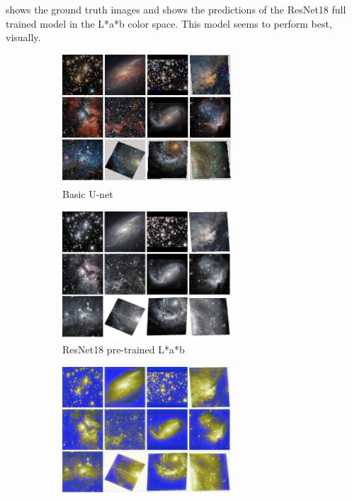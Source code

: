 \documentclass[10pt,twocolumn,letterpaper]{article}
\begin{document}
     shows the ground truth images and  shows the predictions of the ResNet18 full trained model in the L*a*b color space. This model seems to perform best, visually. 
    \begin{figure}[!htb]
    	\centering
    	\begin{subfigure}[t]{0.3\textwidth}
    		\centering
    		\includegraphics[width=0.7\textwidth]{figures/samples_pix2pix}
    		\caption{Basic U-net}
    		\label{fig: u-net_samples}
    	\end{subfigure}
    	\begin{subfigure}[t]{0.3\textwidth}
    		\centering
    		\includegraphics[width=0.7\textwidth]{figures/samples_pre-trained}
    		\caption{ResNet18 pre-trained L*a*b}
    		\label{fig: resnet18_pre}
    	\end{subfigure}
    	\begin{subfigure}[t]{0.3\textwidth}
    		\centering
    		\includegraphics[width=0.7\textwidth]{figures/samples_coco}

\end{subfigure}
\end{figure}
\end{document}
